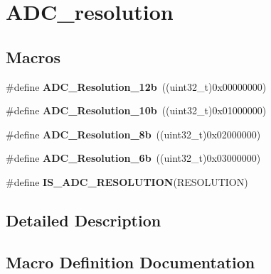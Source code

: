 \hypertarget{group___a_d_c__resolution}{}\section{A\+D\+C\+\_\+resolution}
\label{group___a_d_c__resolution}
\subsection*{Macros}
\begin{DoxyCompactItemize}
\item 
\hypertarget{group___a_d_c__resolution_gac75d52ba1d748fa0b62da488490d98d0}{}\#define {\bfseries A\+D\+C\+\_\+\+Resolution\+\_\+12b}~((uint32\+\_\+t)0x00000000)\label{group___a_d_c__resolution_gac75d52ba1d748fa0b62da488490d98d0}

\item 
\hypertarget{group___a_d_c__resolution_ga783949335d175a2c32cdf46e1313ddac}{}\#define {\bfseries A\+D\+C\+\_\+\+Resolution\+\_\+10b}~((uint32\+\_\+t)0x01000000)\label{group___a_d_c__resolution_ga783949335d175a2c32cdf46e1313ddac}

\item 
\hypertarget{group___a_d_c__resolution_ga79f3c525ef11971c3b8287f6a4a2307d}{}\#define {\bfseries A\+D\+C\+\_\+\+Resolution\+\_\+8b}~((uint32\+\_\+t)0x02000000)\label{group___a_d_c__resolution_ga79f3c525ef11971c3b8287f6a4a2307d}

\item 
\hypertarget{group___a_d_c__resolution_gacda91713c1e31de3142a86e3e1714e97}{}\#define {\bfseries A\+D\+C\+\_\+\+Resolution\+\_\+6b}~((uint32\+\_\+t)0x03000000)\label{group___a_d_c__resolution_gacda91713c1e31de3142a86e3e1714e97}

\item 
\#define {\bfseries I\+S\+\_\+\+A\+D\+C\+\_\+\+R\+E\+S\+O\+L\+U\+T\+I\+O\+N}(R\+E\+S\+O\+L\+U\+T\+I\+O\+N)
\end{DoxyCompactItemize}


\subsection{Detailed Description}


\subsection{Macro Definition Documentation}
\hypertarget{group___a_d_c__resolution_ga346d83dd4af81b36a6dbd78c7bf2ff0a}{}
